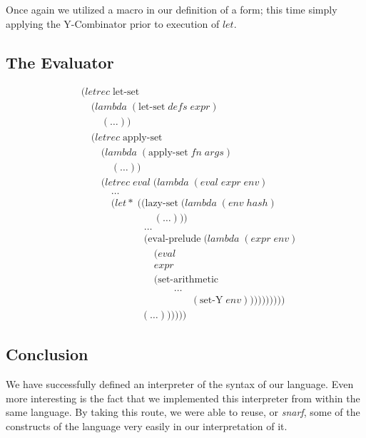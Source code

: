 Once again we utilized a macro in our definition of a form; this time simply
applying the Y-Combinator prior to execution of $let$.

\subsection{The Evaluator}
\begin{figure}[htp]
\caption{}\label{fig:fullEval}
\begin{align*}
& (letrec \; \text{let-set} \; 
\\& \quad (lambda \; (\text{let-set} \; defs \; expr)
\\& \qquad (\dots))
\\& \quad (letrec \; \text{apply-set} \; 
\\& \qquad (lambda \; (\text{apply-set} \; fn \; args)
\\& \qquad \quad (\dots))
\\& \qquad (letrec \; eval \; (lambda \; (eval \; expr \; env)
\\& \qquad \quad \dots
\\& \qquad \quad (let* \; ((\text{lazy-set} \; (lambda \; (env \; hash)
\\& \qquad \qquad \qquad \quad \; (\dots)))
\\& \qquad \qquad \qquad \; \dots
\\& \qquad \qquad \qquad \; (\text{eval-prelude} \; (lambda \; (expr \; env)
\\& \qquad \qquad \qquad \quad \; (eval
\\& \qquad \qquad \qquad \quad \; expr
\\& \qquad \qquad \qquad \quad \; (\text{set-arithmetic}
\\& \qquad \qquad \qquad \qquad \quad \; \dots
\\& \qquad \qquad \qquad \qquad \qquad \quad (\text{set-Y} \; env))))))))))
\\& \qquad \qquad \qquad (\dots))))))
\end{align*}
\end{figure}

\subsection{Conclusion}
We have successfully defined an interpreter of the syntax of our language.
Even more interesting is the fact that we implemented this interpreter from
within the same language. By taking this route, we were able to reuse, or
\emph{snarf}, some of the constructs of the language very easily in our
interpretation of it.

